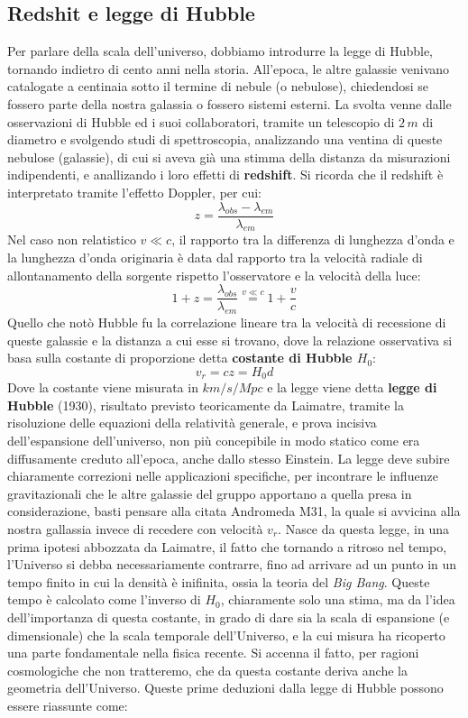 \documentclass[a4paper,twoside,openany,notitlepage]{book}
\theoremstyle{definition}
\theoremstyle{plain}
\begin{document}
\subsection*{Redshit e legge di Hubble}
Per parlare della scala dell'universo, dobbiamo introdurre la legge di Hubble, tornando indietro di cento anni nella storia. All'epoca, le altre galassie venivano catalogate a centinaia sotto il termine di nebule (o nebulose), chiedendosi se fossero parte della nostra galassia o fossero sistemi esterni. La svolta venne dalle osservazioni di Hubble ed i suoi collaboratori, tramite un telescopio di $2\,m$ di diametro e svolgendo studi di spettroscopia, analizzando una ventina di queste nebulose (galassie), di cui si aveva già una stimma della distanza da misurazioni indipendenti, e anallizando i loro effetti di \textbf{redshift}. Si ricorda che il redshift è interpretato tramite l'effetto Doppler, per cui:
\begin{equation*}
	z=\frac{\lambda_{obs}-\lambda_{em}}{\lambda_{em}}
\end{equation*}
Nel caso non relatistico $v \ll c$, il rapporto tra la differenza di lunghezza d'onda e la lunghezza d'onda originaria è data dal rapporto tra la velocità radiale di allontanamento della sorgente rispetto l'osservatore e la velocità della luce:
\begin{equation*}
	1+z = \frac{\lambda_{obs}}{\lambda_{em}} \overset{v \ll c}{=} 1+\frac{v}{c}
\end{equation*}
Quello che notò Hubble fu la correlazione lineare tra la velocità di recessione di queste galassie e la distanza a cui esse si trovano, dove la relazione osservativa si basa sulla costante di proporzione detta \textbf{costante di Hubble $H_0$}:
\begin{equation}
	\label{eq:Hubble}
	v_r=cz=H_0d
\end{equation}
Dove la costante viene misurata in $km/s/Mpc$ e la legge viene detta \textbf{legge di Hubble} (1930), risultato previsto teoricamente da Laimatre, tramite la risoluzione delle equazioni della relatività generale, e prova incisiva dell'espansione dell'universo, non più concepibile in modo statico come era diffusamente creduto all'epoca, anche dallo stesso Einstein. La legge deve subire chiaramente correzioni nelle applicazioni specifiche, per incontrare le influenze gravitazionali che le altre galassie del gruppo apportano a quella presa in considerazione, basti pensare alla citata Andromeda M31, la quale si avvicina alla nostra gallassia invece di recedere con velocità $v_r$. Nasce da questa legge, in una prima ipotesi abbozzata da Laimatre, il fatto che tornando a ritroso nel tempo, l'Universo si debba necessariamente contrarre, fino ad arrivare ad un punto in un tempo finito in cui la densità è inifinita, ossia la teoria del \textit{Big Bang}. Queste tempo è calcolato come l'inverso di $H_0$, chiaramente solo una stima, ma da l'idea dell'importanza di questa costante, in grado di dare sia la scala di espansione (e dimensionale) che la scala temporale dell'Universo, e la cui misura ha ricoperto una parte fondamentale nella fisica recente. Si accenna il fatto, per ragioni cosmologiche che non tratteremo, che da questa costante deriva anche la geometria dell'Universo. Queste prime deduzioni dalla legge di Hubble possono essere riassunte come:
\end{document}
